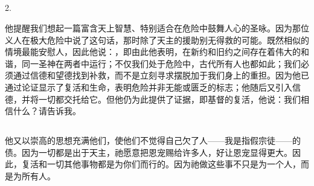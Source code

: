 \subsection{}

2.  \par

他提醒我们想起一篇富含天上智慧、特别适合在危险中鼓舞人心的圣咏。因为那位义人在极大危险中说了这句话，那时除了天主的援助别无得救的可能。既然相似的情境最能安慰人，因此他说：，即由此他表明，在新约和旧约之间存在着伟大的和谐，同一圣神在两者中运行；不仅我们处于危险中，古代所有人也都如此；我们必须通过信德和望德找到补救，而不是立刻寻求摆脱加于我们身上的重担。因为他已通过论证显示了复活和生命，表明危险并非无能或匮乏的标志；他随后又引入信德，并将一切都交托给它。但他仍为此提供了证据，即基督的复活，他说：我们相信什么？请告诉我。\par


\subsection{}

\par

他又以崇高的思想充满他们，使他们不觉得自己欠了人——我是指假宗徒——的债。因为一切都是出于天主，祂愿意把恩宠赐给许多人，好让恩宠显得更大。因此，复活和一切其他事物都是为你们而行的。因为祂做这些事不只是为一个人，而是为所有人。\par


\subsection{}

\par

